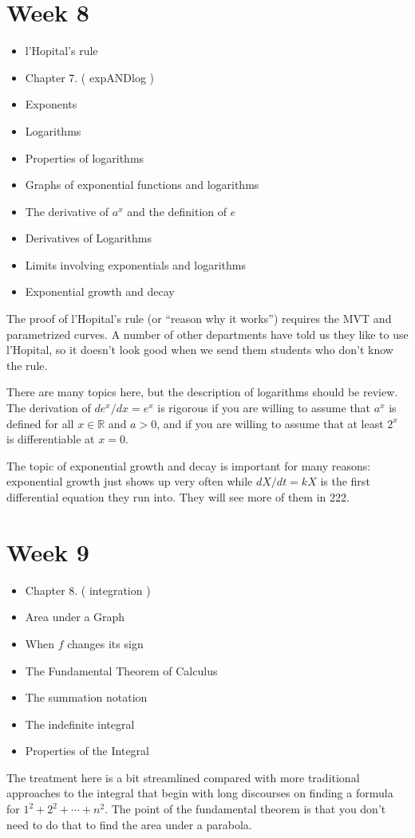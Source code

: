 \documentclass{amsproc}
\begin{document}
\section*{Week 8}
\begin{itemize}
\item l'Hopital's rule
\item Chapter 7. ( expANDlog )
\item Exponents
\item Logarithms
\item Properties of logarithms
\item Graphs of exponential functions and logarithms
\item The derivative of $a^x$ and the definition of $e$
\item Derivatives of Logarithms
\item Limits involving exponentials and logarithms
\item Exponential growth and decay
\end{itemize}
The proof of l'Hopital's rule (or ``reason why it works'')
requires the MVT and parametrized curves.  A number of other departments have
told us they like to use l'Hopital, so it doesn't look good when we send them
students who don't know the rule.

There are many topics here, but the description of logarithms should be review.
The derivation of $de^x/dx=e^x$ is rigorous if you are willing to assume that
$a^x$ is defined for all $x\in\mathbb{R}$ and $a>0$, and if you are willing to
assume that at least $2^x$ is differentiable at $x=0$.

The topic of exponential growth and decay is important for many reasons:
exponential growth just shows up very often while $dX/dt = kX$ is the first
differential equation they run into. They will see more of them in 222.

\section*{Week 9}
\begin{itemize}
\item Chapter 8. ( integration )
\item Area under a Graph
\item When $f$ changes its sign
\item The Fundamental Theorem of Calculus
\item The summation notation
\item The indefinite integral
\item Properties of the Integral
\end{itemize}
The treatment here is a bit streamlined compared with more traditional
approaches to the integral that begin with long discourses on finding a formula
for $1^2+2^2+\cdots+n^2$.  The point of the fundamental theorem is that you
don't need to do that to find the area under a parabola.
\end{document}
